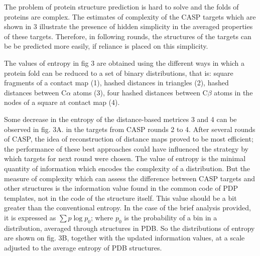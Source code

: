 \documentclass[12pt,aps]{revtex4}
\begin{document}
The problem of protein structure prediction is hard to solve and the folds of proteins are complex. The estimates of complexity of the CASP targets which are shown in 3 illustrate the presence of hidden simplicity in the averaged properties of these targets. Therefore, in following rounds, the structures of the targets can be be predicted more easily, if reliance is placed on this simplicity.

The values of entropy in fig 3 are obtained using the different ways in which a protein fold can be reduced to a set of binary distributions, that is: square fragments of a contact map (1), hashed distances in triangles (2), hashed distances between C$\alpha$ atoms (3), four hashed distances between C$\beta$ atoms in the nodes of a square at contact map (4).

Some decrease in the entropy of the distance-based metrices 3 and 4 can be observed in fig. 3A. in the targets from CASP rounds 2 to 4. After several rounds of CASP, the idea of reconstruction of distance maps proved to be most efficient; the performance of these best approaches could have influenced the strategy by which targets for next round were chosen.
The value of entropy is the minimal quantity of information which encodes the complexity of a distribution. But the measure of complexity which can assess the difference between CASP targets and other structures is the information value found in the common code of PDP templates, not in the code of the structure itself. This value should be a bit greater than the conventional entropy. In the case of the brief analysis provided, it is expressed as $\sum{p\log{p_0}}$; where $p_0$ is the probability of a bin in a distribution, averaged through structures in PDB. So the distributions of entropy are shown on fig. 3B, together with the updated information values, at a scale adjusted to the average entropy of PDB structures.
\end{document}
